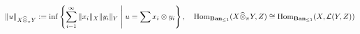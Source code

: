\documentclass[preview]{standalone}
\begin{document}
\begin{align*}
\special{dvisvgm:raw <g id='unique000'>}\|u\|_{X\widehat{\otimes}_\pi Y} := \inf\left\{\sum_{i=1}^\infty \|x_i\|_X\|y_i\|_Y \;\middle|\; u=\sum x_i\otimes y_i\right\}, \quad \operatorname{Hom}_{\mathbf{Ban}_{\le 1}}(X\widehat{\otimes}_\pi Y, Z) \cong \operatorname{Hom}_{\mathbf{Ban}_{\le 1}}(X, \mathcal{L}(Y, Z))\special{dvisvgm:raw </g>}
\end{align*}
\end{document}
